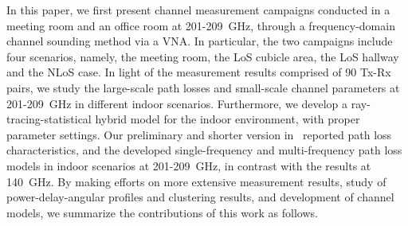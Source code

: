 \documentclass[journal,12pt,draftclsnofoot,onecolumn]{IEEEtran}
\begin{document}
\par In this paper, we first present channel measurement campaigns conducted in a meeting room and an office room at 201-209~GHz, through a frequency-domain channel sounding method via a VNA. In particular, the two campaigns include four scenarios, namely, the meeting
room, the LoS cubicle area, the LoS hallway and the NLoS case. In light of the measurement results comprised of 90 Tx-Rx pairs, we study the large-scale path losses and small-scale channel parameters at 201-209~GHz in different indoor scenarios. Furthermore, we develop a ray-tracing-statistical hybrid model for the indoor environment, with proper parameter settings.
Our preliminary and shorter version in~\cite{he2021channel} reported path loss characteristics, and the developed single-frequency and multi-frequency path loss models in indoor scenarios at 201-209~GHz, in contrast with the results at 140~GHz. By making efforts on more extensive measurement results, study of power-delay-angular profiles and clustering results, and development of channel models, we summarize the contributions of this work as follows.
\end{document}
